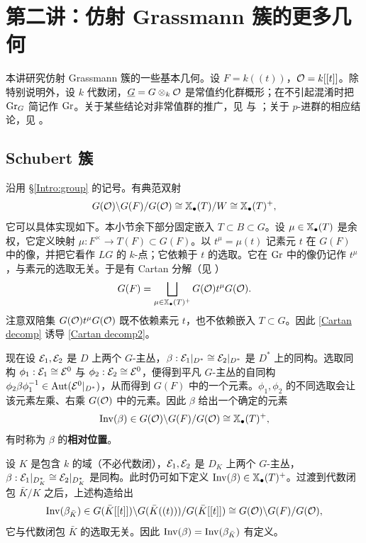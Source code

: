 
\section{第二讲：仿射 Grassmann 簇的更多几何}\label{Lecture II}

本讲研究仿射 Grassmann 簇的一些基本几何。设 $F=k((t))$，${\mathcal O}=k[[t]]$。除特别说明外，设 $k$ 代数闭，$\underline G=G\otimes_k {\mathcal O}$ 是常值约化群概形；在不引起混淆时把 ${\operatorname{Gr}}_{G}$ 简记作 ${\operatorname{Gr}}$。关于某些结论对非常值群的推广，见 \cite{PR} 与 \cite[\S\ 6.3]{Z11}；关于 $p$-进群的相应结论，见 \cite{Z14}。

\subsection{Schubert 簇}\label{II:Sch var}

沿用 \S\ref{Intro:group} 的记号。有典范双射
\begin{equation}\label{Cartan decomp2}
G({\mathcal O})\backslash G(F)/G({\mathcal O})\cong \mathbb{X}_\bullet(T)/W\cong \mathbb{X}_\bullet(T)^+,
\end{equation}
它可以具体实现如下。本小节余下部分固定嵌入 $T\subset B\subset G$。设 $\mu\in\mathbb{X}_\bullet(T)$ 是余权，它定义映射 $\mu:F^\times\to T(F)\subset G(F)$。以 $t^\mu=\mu(t)$ 记素元 $t$ 在 $G(F)$ 中的像，并把它看作 $LG$ 的 $k$-点；它依赖于 $t$ 的选取。它在 ${\operatorname{Gr}}$ 中的像仍记作 $t^\mu$，与素元的选取无关。于是有 Cartan 分解（见 \cite[\S\ 3.3.3]{Ti}）
\begin{equation}\label{Cartan decomp}
G(F)=\bigsqcup_{\mu\in\mathbb{X}_\bullet(T)^+} G({\mathcal O})t^\mu G({\mathcal O}).
\end{equation}
注意双陪集 $G({\mathcal O})t^\mu G({\mathcal O})$ 既不依赖素元 $t$，也不依赖嵌入 $T\subset G$。因此 \eqref{Cartan decomp} 诱导 \eqref{Cartan decomp2}。

现在设 ${\mathcal E}_1,{\mathcal E}_2$ 是 $D$ 上两个 $G$-主丛，$\beta: {\mathcal E}_1|_{D^*}\cong {\mathcal E}_2|_{D^*}$ 是 $D^*$ 上的同构。选取同构 $\phi_1:{\mathcal E}_1\cong {\mathcal E}^0$ 与 $\phi_2:{\mathcal E}_2\cong {\mathcal E}^0$，便得到平凡 $G$-主丛的自同构 $\phi_2\beta\phi_1^{-1}\in {\operatorname{Aut}}({\mathcal E}^0|_{D^*})$，从而得到 $G(F)$ 中的一个元素。$\phi_1,\phi_2$ 的不同选取会让该元素左乘、右乘 $G({\mathcal O})$ 中的元素。因此 $\beta$ 给出一个确定的元素
\[{\operatorname{Inv}}(\beta)\in G({\mathcal O})\backslash G(F)/G({\mathcal O})\cong \mathbb{X}_\bullet(T)^+,\]
有时称为 $\beta$ 的\textbf{相对位置}。

\begin{rmk}\label{non-algebraically closed}
设 $K$ 是包含 $k$ 的域（不必代数闭），${\mathcal E}_1, {\mathcal E}_2$ 是 $D_K$ 上两个 $G$-主丛，$\beta: {\mathcal E}_1|_{D^*_K}\cong {\mathcal E}_2|_{D^*_K}$ 是同构。此时仍可如下定义 ${\operatorname{Inv}}(\beta)\in \mathbb{X}_\bullet(T)^+$。过渡到代数闭包 $\bar K/K$ 之后，上述构造给出
\[{\operatorname{Inv}}(\beta_{\bar K})\in G(\bar K[[t]])\backslash G(\bar K((t)))/G(\bar K[[t]])\cong G({\mathcal O})\backslash G(F)/G({\mathcal O}),\]
它与代数闭包 $\bar K$ 的选取无关。因此 ${\operatorname{Inv}}(\beta)={\operatorname{Inv}}(\beta_{\bar K})$ 有定义。
\end{rmk}

